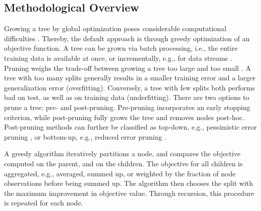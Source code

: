\documentclass[a4paper, 11pt]{article}
\begin{document}

\subsection{Methodological Overview}

Growing a tree by global optimization poses considerable computational difficulties \cite{norouzi_nongreedy_tree}. Thereby, the default approach is through greedy optimization of an objective function. A tree can be grown via batch processing, i.e., the entire training data is available at once, or incrementally, e.g., for data streams \cite{potts_incremental_model_tree}. Pruning weighs the trade-off between growing a tree too large and too small \cite{hastie_elemstatlearn}. A tree with too many splits generally results in a smaller training error and a larger generalization error (overfitting). Conversely, a tree with few splits both performs bad on test, as well as on training data (underfitting). There are two options to prune a tree: pre- and post-pruning. Pre-pruning incorporates an early stopping criterion, while post-pruning fully grows the tree and removes nodes post-hoc. Post-pruning methods can further be classified as top-down, e.g., pessimistic error pruning \cite{quinlan_simplifying}, or bottom-up, e.g., reduced error pruning \cite{quinlan_simplifying}.
\par
A greedy algorithm iteratively partitions a node, and compares the objective computed on the parent, and on the children. The objective for all children is aggregated, e.g., averaged, summed up, or weighted by the fraction of node observations before being summed up. The algorithm then chooses the split with the maximum improvement in objective value. Through recursion, this procedure is repeated for each node.
\end{document}

